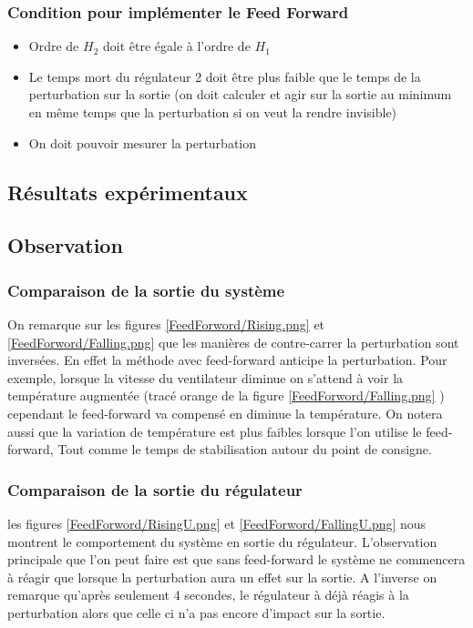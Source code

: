 \subsubsection{Condition pour implémenter le Feed Forward}
\begin{itemize}
\item Ordre de $H_{2}$ doit être égale à l'ordre de $H_{1}$
\item Le temps mort du régulateur 2 doit être plus faible que le temps de la perturbation sur la sortie (on doit calculer et agir sur la sortie au minimum en même temps que la perturbation si on veut la rendre invisible)
\item On doit pouvoir mesurer la perturbation
\end{itemize}
\newpage
\subsection{Résultats expérimentaux}
\subsection{Observation}
\subsubsection{Comparaison de la sortie du système}
On remarque sur les figures \ref{FeedForword/Rising.png} et  \ref{FeedForword/Falling.png} que les manières de contre-carrer la perturbation sont inversées. En effet la méthode avec feed-forward anticipe la perturbation. Pour exemple, lorsque la vitesse du ventilateur diminue on s'attend à voir la température augmentée (tracé orange de la figure  \ref{FeedForword/Falling.png} ) cependant le feed-forward va compensé en diminue la température. 
On notera aussi que la variation de température est plus faibles lorsque l'on utilise le feed-forward, Tout comme le temps de stabilisation autour du point de consigne.

\subsubsection{Comparaison de la sortie du régulateur}
les figures \ref{FeedForword/RisingU.png} et \ref{FeedForword/FallingU.png} nous montrent le comportement du système en sortie du régulateur. L'observation principale que l'on peut faire est que sans feed-forward le système ne commencera à réagir que lorsque la perturbation aura un effet sur la sortie. A l'inverse on remarque qu'après seulement 4 secondes, le régulateur à déjà réagis à la perturbation alors que celle ci n'a pas encore d'impact sur la sortie.
